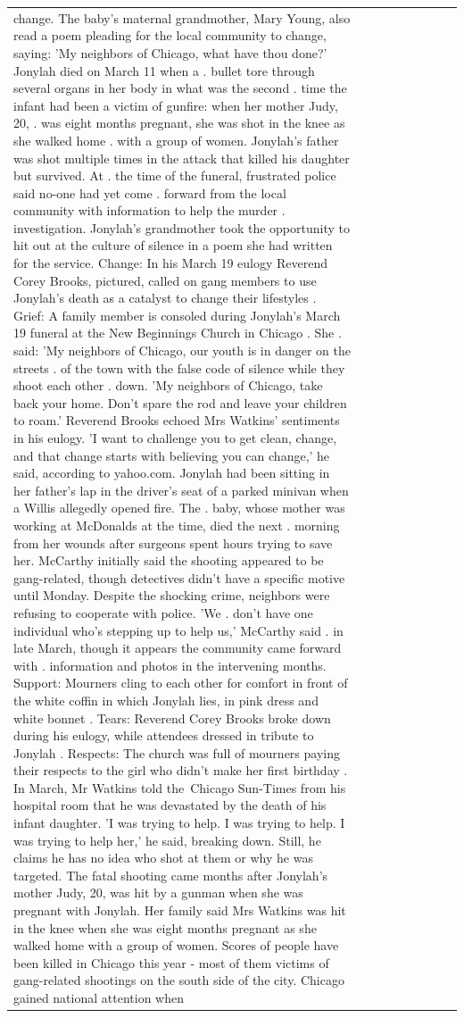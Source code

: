\begin{table}[H]
\begin{tabular}{lllrlllll}
change. The baby's maternal grandmother, Mary Young, also read a poem pleading for the local community to change, saying: 'My neighbors of Chicago, what have thou done?' Jonylah died on March 11 when a . bullet tore through several organs in her body in what was the second . time the infant had been a victim of gunfire: when her mother Judy, 20, . was eight months pregnant, she was shot in the knee as she walked home . with a group of women. Jonylah's father was shot multiple times in the attack that killed his daughter but survived. At . the time of the funeral, frustrated police said no-one had yet come . forward from the local community with information to help the murder . investigation. Jonylah's grandmother took the opportunity to hit out at the culture of silence in a poem she had written for the service. Change: In his March 19 eulogy Reverend Corey Brooks, pictured, called on gang members to use Jonylah's death as a catalyst to change their lifestyles . Grief: A family member is consoled during Jonylah's March 19 funeral at the New Beginnings Church in Chicago . She . said: 'My neighbors of Chicago, our youth is in danger on the streets . of the town with the false code of silence while they shoot each other . down. 'My neighbors of Chicago, take back your home. Don't spare the rod and leave your children to roam.' Reverend Brooks echoed Mrs Watkins' sentiments in his eulogy. 'I want to challenge you to get clean, change, and that change starts with believing you can change,' he said, according to yahoo.com. Jonylah had been sitting in her father's lap in the driver's seat of a parked minivan when a Willis allegedly opened fire. The . baby, whose mother was working at McDonalds at the time, died the next . morning from her wounds after surgeons spent hours trying to save her. McCarthy initially said the shooting appeared to be gang-related, though detectives didn't have a specific motive until Monday. Despite the shocking crime, neighbors were refusing to cooperate with police. 'We . don't have one individual who's stepping up to help us,' McCarthy said . in late March, though it appears the community came forward with . information and photos in the intervening months. Support: Mourners cling to each other for comfort in front of the white coffin in which Jonylah lies, in pink dress and white bonnet . Tears: Reverend Corey Brooks broke down during his eulogy, while attendees dressed in tribute to Jonylah . Respects: The church was full of mourners paying their respects to the girl who didn't make her first birthday . In March, Mr Watkins told the Chicago Sun-Times from his hospital room that he was devastated by the death of his infant daughter. 'I was trying to help. I was trying to help. I was trying to help her,' he said, breaking down. Still, he claims he has no idea who shot at them or why he was targeted. The fatal shooting came months after Jonylah's mother Judy, 20, was hit by a gunman when she was pregnant with Jonylah. Her family said Mrs Watkins was hit in the knee when she was eight months pregnant as she walked home with a group of women. Scores of people have been killed in Chicago this year - most of them victims of gang-related shootings on the south side of the city. Chicago gained national attention when 
\end{tabular}
\end{table}
